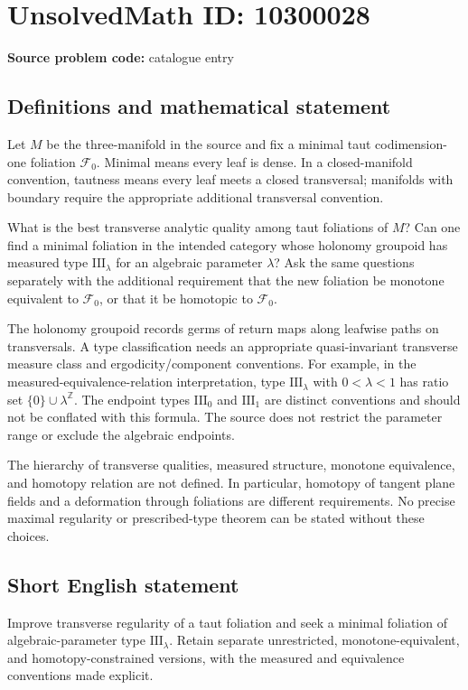 \documentclass[11pt]{article}
\begin{document}
\section*{UnsolvedMath ID: 10300028}
\textbf{Source problem code:} catalogue entry
\subsection{Definitions and mathematical statement}
Let $M$ be the three-manifold in the source and fix a minimal taut codimension-one foliation $\mathcal F_0$. Minimal means every leaf is dense. In a closed-manifold convention, tautness means every leaf meets a closed transversal; manifolds with boundary require the appropriate additional transversal convention.

What is the best transverse analytic quality among taut foliations of $M$? Can one find a minimal foliation in the intended category whose holonomy groupoid has measured type $\mathrm{III}_\lambda$ for an algebraic parameter $\lambda$? Ask the same questions separately with the additional requirement that the new foliation be monotone equivalent to $\mathcal F_0$, or that it be homotopic to $\mathcal F_0$.

The holonomy groupoid records germs of return maps along leafwise paths on transversals. A type classification needs an appropriate quasi-invariant transverse measure class and ergodicity/component conventions. For example, in the measured-equivalence-relation interpretation, type $\mathrm{III}_\lambda$ with $0<\lambda<1$ has ratio set $\{0\}\cup\lambda^{\mathbb Z}$. The endpoint types $\mathrm{III}_0$ and $\mathrm{III}_1$ are distinct conventions and should not be conflated with this formula. The source does not restrict the parameter range or exclude the algebraic endpoints.

The hierarchy of transverse qualities, measured structure, monotone equivalence, and homotopy relation are not defined. In particular, homotopy of tangent plane fields and a deformation through foliations are different requirements. No precise maximal regularity or prescribed-type theorem can be stated without these choices.
\subsection{Short English statement}
Improve transverse regularity of a taut foliation and seek a minimal foliation of algebraic-parameter type $\mathrm{III}_\lambda$. Retain separate unrestricted, monotone-equivalent, and homotopy-constrained versions, with the measured and equivalence conventions made explicit.
\end{document}
